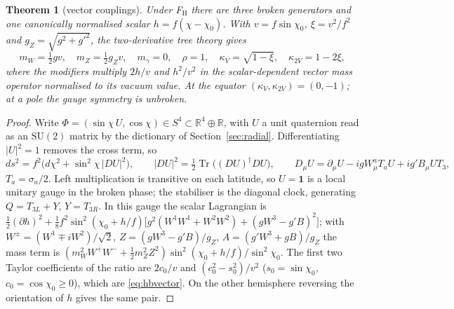 \documentclass[aps,pra,onecolumn,superscriptaddress,nofootinbib,10pt]{revtex4-2}
\newtheorem{theorem}{Theorem}
\theoremstyle{definition}
\theoremstyle{remark}
\newcommand{\R}{\mathbb{R}}
\newcommand{\tr}{\operatorname{Tr}}
\newcommand{\SU}{\mathrm{SU}}
\begin{document}
\begin{theorem}[vector couplings]\label{thm:hbvector}
Under F$_{\mathrm H}$ there are three broken generators and one canonically normalised scalar $h=f(\chi-\chi_0)$.  With
$v=f\sin\chi_0$, $\xi=v^2/f^2$ and $g_Z=\sqrt{g^2+g'^2}$, the two-derivative tree theory gives
\begin{equation}\label{eq:hbvector}
m_W=\tfrac12gv,\quad m_Z=\tfrac12g_Zv,\quad m_\gamma=0,\quad \rho=1,\quad \kappa_V=\sqrt{1-\xi},\quad \kappa_{2V}=1-2\xi,
\end{equation}
where the modifiers multiply $2h/v$ and $h^2/v^2$ in the scalar-dependent vector mass operator normalised to its
vacuum value.  At the equator $(\kappa_V,\kappa_{2V})=(0,-1)$; at a pole the gauge symmetry is unbroken.
\end{theorem}
\begin{proof}
Write $\Phi=(\sin\chi\,U,\cos\chi)\in S^4\subset\R^4\oplus\R$, with $U$ a unit quaternion read as an $\SU(2)$ matrix by the dictionary
of Section~\ref{sec:radial}.  Differentiating $\lvert U\rvert^2=1$ removes the cross term, so
\begin{equation}\label{eq:hbmetric}
ds^2=f^2\bigl(d\chi^2+\sin^2\chi\,\lvert DU\rvert^2\bigr),\qquad \lvert DU\rvert^2=\tfrac12\tr\bigl((DU)^\dagger DU\bigr),\qquad
D_\mu U=\partial_\mu U-igW^a_\mu T_aU+ig'B_\mu UT_3,
\end{equation}
$T_a=\sigma_a/2$.  Left multiplication is transitive on each latitude, so $U=\mathbf1$ is a local unitary gauge in the
broken phase; the stabiliser is the diagonal clock, generating $Q=T_{3L}+Y$, $Y=T_{3R}$.  In this gauge the
scalar Lagrangian is $\tfrac12(\partial h)^2+\tfrac18f^2\sin^2(\chi_0+h/f)\bigl[g^2(W^1W^1+W^2W^2)+(gW^3-g'B)^2\bigr]$; with $W^\pm=(W^1\mp iW^2)/\sqrt2$,
$Z=(gW^3-g'B)/g_Z$, $A=(g'W^3+gB)/g_Z$ the mass term is $(m_W^2W^+W^-+\tfrac12m_Z^2Z^2)\sin^2(\chi_0+h/f)/\sin^2\chi_0$.  The first two
Taylor coefficients of the ratio are $2c_0/v$ and $(c_0^2-s_0^2)/v^2$ ($s_0=\sin\chi_0$, $c_0=\cos\chi_0\ge0$), which are \eqref{eq:hbvector}.
On the other hemisphere reversing the orientation of $h$ gives the same pair.
\end{proof}
\end{document}
